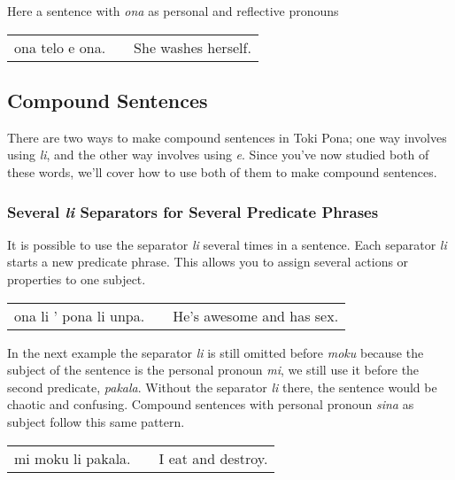 Here a sentence with \textit{ona} as personal and reflective pronouns

\begin{supertabular}{p{5,5cm}|ll}
ona telo e ona. && She washes herself. \\
\end{supertabular}

{}
\subsection*{Compound Sentences}
%
There are two ways to make compound sentences in Toki Pona; one way involves using \textit{li}, and the other way involves using \textit{e}. 
Since you've now studied both of these words, we'll cover how to use both of them to make compound sentences. 

%
\label{'multiple_li'}
\subsubsection*{Several \textit{li} Separators for Several Predicate Phrases}
%

It is possible to use the separator \textit{li} several times in a sentence. 
Each separator \textit{li} starts a new predicate phrase. 
This allows you to assign several actions or properties to one subject. 

\begin{supertabular}{p{5,5cm}|ll}
ona li ' pona li unpa. && He's awesome and has sex. \\
\end{supertabular} 

In the next example the separator \textit{li} is still omitted before \textit{moku} because the subject of the sentence is the personal pronoun \textit{mi}, we still use it before the second predicate, \textit{pakala}. 
Without the separator \textit{li} there, the sentence would be chaotic and confusing. 
Compound sentences with personal pronoun \textit{sina} as subject follow this same pattern. 

\begin{supertabular}{p{5,5cm}|ll}
mi moku li pakala. && I eat and destroy. \\
\end{supertabular} 

